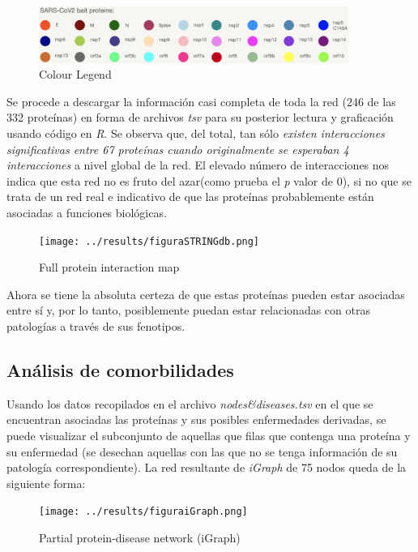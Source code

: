 	\begin{figure}[h!]
		\includegraphics[width=0.9\textwidth]{figures/PPIColourLegend.png}
		\caption{Colour Legend}
		\label{fig:ppi_legend}
	\end{figure}

Se procede a descargar la información casi completa de toda la red (246 de las 332 proteínas) en forma de archivos \textit{tsv} para su posterior lectura y graficación usando código en \textit{R}. Se observa que, del total, tan sólo \emph{existen interacciones significativas entre 67 proteínas cuando originalmente se esperaban 4 interacciones} a nivel global de la red. El elevado número de interacciones nos indica que esta red no es fruto del azar(como prueba el \textit{p} valor de 0), si no que se trata de un red real e indicativo de que las proteínas probablemente están asociadas a funciones biológicas.

	\begin{figure}[h!]
		\texttt{[image: ../results/figuraSTRINGdb.png]}
		\caption{Full protein interaction map}
		\label{fig:ppi_stringdb}
	\end{figure}

Ahora se tiene la absoluta certeza de que estas proteínas pueden estar asociadas entre sí y, por lo tanto, posiblemente puedan estar relacionadas con otras patologías a través de sus fenotipos.
	
\subsection{Análisis de comorbilidades}

Usando los datos recopilados en el archivo \textit{nodes&diseases.tsv} en el que se encuentran asociadas las proteínas y sus posibles enfermedades derivadas, se puede visualizar el subconjunto de aquellas que filas que contenga una proteína y su enfermedad (se desechan aquellas con las que no se tenga información de su patología correspondiente). La red resultante de \textit{iGraph} de 75 nodos queda de la siguiente forma:

	\begin{figure}[h!]
		\texttt{[image: ../results/figuraiGraph.png]}
		\caption{Partial protein-disease network (iGraph)}
		\label{fig:ppi_sigraph}
	\end{figure}
	
